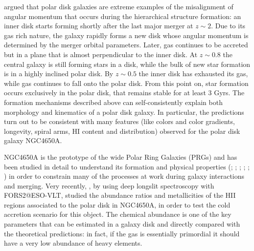 \documentclass{aa}
\begin{document}
\cite{Bro08} argued that
polar disk galaxies are extreme examples of the misalignment of
angular momentum that occurs during the hierarchical structure
formation: an inner disk starts forming shortly after the last major
merger at $z \sim 2$. Due to its gas rich nature, the galaxy rapidly
forms a new disk whose angular momentum is determined by the merger
orbital parameters. Later, gas continues to be accreted but in a plane
that is almost perpendicular to the inner disk. At $z \sim 0.8$ the
central galaxy is still forming stars in a disk, while the bulk of new
star formation is in a highly inclined polar disk. By $z\sim 0.5$
the inner disk has exhausted its gas, while gas continues to fall onto
the polar disk. From this point on, star formation occurs exclusively in
the polar disk, that remains stable for at least 3 Gyrs. The
formation mechanisms described above can self-consistently explain both
morphology and kinematics of a polar disk galaxy. In particular, the
predictions turn out to be consistent with many features (like colors
and color gradients, longevity, spiral arms, HI content and
distribution) observed for the polar disk galaxy NGC4650A.

NGC4650A is the prototype of the wide Polar Ring Galaxies (PRGs) and has
been studied in detail to understand its formation and physical
properties (\citealt{Arn97}; \citealt{Gal02}; \citealt{Iod02};
\citealt{Swa03}; \citealt{Bou03}; \citealt{Iod06}) in order to
constrain many of the processes at work during galaxy interactions and
merging.  Very recently, \cite{Spav10}, by using deep longslit
spectroscopy with FORS2@ESO-VLT, studied the abundance ratios and
metallicities of the HII regions associated to the polar disk in
NGC4650A, in order to test the cold accretion scenario for this
object. The chemical abundance is one of the key parameters that can
be estimated in a galaxy disk and directly compared with the
theoretical predictions: in fact, if the gas is essentially primordial
it should have a very low abundance of heavy elements.
\end{document}
